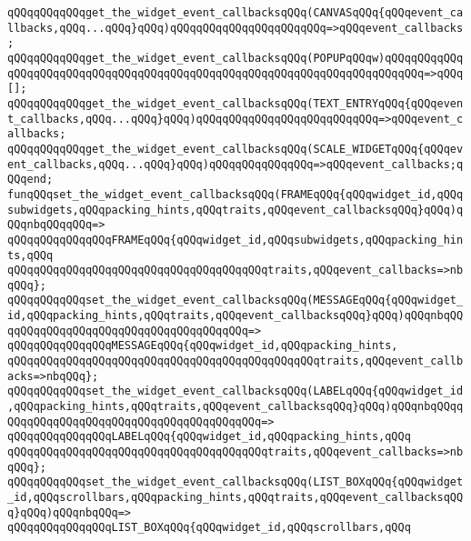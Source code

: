\verb|qQQqqQQqqQQqget_the_widget_event_callbacksqQQq(CANVASqQQq{qQQqevent_callbacks,qQQq...qQQq}qQQq)qQQqqQQqqQQqqQQqqQQqqQQq=>qQQqevent_callbacks;|\newline
\verb|qQQqqQQqqQQqget_the_widget_event_callbacksqQQq(POPUPqQQqw)qQQqqQQqqQQqqQQqqQQqqQQqqQQqqQQqqQQqqQQqqQQqqQQqqQQqqQQqqQQqqQQqqQQqqQQqqQQq=>qQQq[];|\newline
\verb|qQQqqQQqqQQqget_the_widget_event_callbacksqQQq(TEXT_ENTRYqQQq{qQQqevent_callbacks,qQQq...qQQq}qQQq)qQQqqQQqqQQqqQQqqQQqqQQqqQQq=>qQQqevent_callbacks;|\newline
\verb|qQQqqQQqqQQqget_the_widget_event_callbacksqQQq(SCALE_WIDGETqQQq{qQQqevent_callbacks,qQQq...qQQq}qQQq)qQQqqQQqqQQqqQQq=>qQQqevent_callbacks;qQQqend;|\newline
\newline
\verb|funqQQqset_the_widget_event_callbacksqQQq(FRAMEqQQq{qQQqwidget_id,qQQqsubwidgets,qQQqpacking_hints,qQQqtraits,qQQqevent_callbacksqQQq}qQQq)qQQqnbqQQqqQQq=>|\newline
\verb|qQQqqQQqqQQqqQQqFRAMEqQQq{qQQqwidget_id,qQQqsubwidgets,qQQqpacking_hints,qQQq|\newline
\verb|qQQqqQQqqQQqqQQqqQQqqQQqqQQqqQQqqQQqqQQqtraits,qQQqevent_callbacks=>nbqQQq};|\newline
\verb|qQQqqQQqqQQqset_the_widget_event_callbacksqQQq(MESSAGEqQQq{qQQqwidget_id,qQQqpacking_hints,qQQqtraits,qQQqevent_callbacksqQQq}qQQq)qQQqnbqQQqqQQqqQQqqQQqqQQqqQQqqQQqqQQqqQQqqQQq=>|\newline
\verb|qQQqqQQqqQQqqQQqMESSAGEqQQq{qQQqwidget_id,qQQqpacking_hints,|\newline
\verb|qQQqqQQqqQQqqQQqqQQqqQQqqQQqqQQqqQQqqQQqqQQqqQQqtraits,qQQqevent_callbacks=>nbqQQq};|\newline
\verb|qQQqqQQqqQQqset_the_widget_event_callbacksqQQq(LABELqQQq{qQQqwidget_id,qQQqpacking_hints,qQQqtraits,qQQqevent_callbacksqQQq}qQQq)qQQqnbqQQqqQQqqQQqqQQqqQQqqQQqqQQqqQQqqQQqqQQqqQQq=>|\newline
\verb|qQQqqQQqqQQqqQQqLABELqQQq{qQQqwidget_id,qQQqpacking_hints,qQQq|\newline
\verb|qQQqqQQqqQQqqQQqqQQqqQQqqQQqqQQqqQQqqQQqtraits,qQQqevent_callbacks=>nbqQQq};|\newline
\verb|qQQqqQQqqQQqset_the_widget_event_callbacksqQQq(LIST_BOXqQQq{qQQqwidget_id,qQQqscrollbars,qQQqpacking_hints,qQQqtraits,qQQqevent_callbacksqQQq}qQQq)qQQqnbqQQq=>|\newline
\verb|qQQqqQQqqQQqqQQqLIST_BOXqQQq{qQQqwidget_id,qQQqscrollbars,qQQq|\newline
